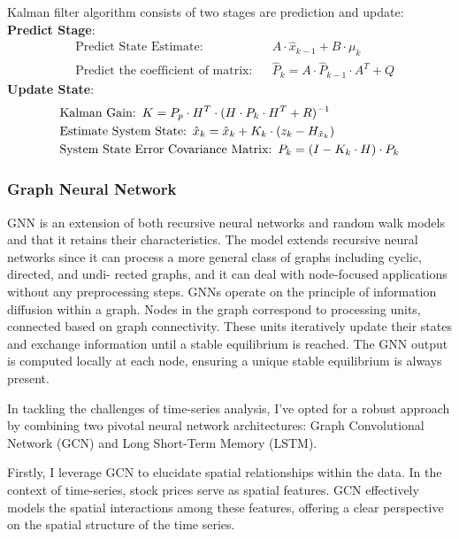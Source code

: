 \documentclass{ieeeojies}
\begin{document}
 Kalman filter algorithm consists of two stages are prediction and update: \\
\textbf{Predict Stage}:
    \begin{align*}
    &\text{Predict State Estimate:} && A \cdot \hat{x}_{k-1} + B \cdot \mu_k \\
    &\text{Predict the coefficient of matrix:} && \hat{P}_k = A \cdot \hat{P}_{k-1} \cdot A^T + Q
\end{align*}
\textbf{Update State}:
    \begin{align*}
    &\text{Kalman Gain:} \hspace{0.5em} K = P_p \cdot H^T \cdot (H \cdot P_k \cdot H^T + R)^{-1} \\
    &\text{Estimate System State:} \hspace{0.5em} \hat{x}_k = \hat{x}_k + K_k \cdot (z_k - H_{\hat{x}_k}) \\
    &\text{System State Error Covariance Matrix:} \hspace{0.5em} P_k = (I - K_k \cdot  H)\cdot P_k
    \end{align*}
    
\subsubsection{\textbf{Graph Neural Network}}
GNN is an extension of both recursive neural networks and random walk models and that it retains their characteristics. The model extends recursive neural networks since it can process a more general class of graphs including cyclic, directed, and undi- rected graphs, and it can deal with node-focused applications without any preprocessing steps. GNNs operate on the principle of information diffusion within a graph. Nodes in the graph correspond to processing units, connected based on graph connectivity. These units iteratively update their states and exchange information until a stable equilibrium is reached. The GNN output is computed locally at each node, ensuring a unique stable equilibrium is always present.

In tackling the challenges of time-series analysis, I've opted for a robust approach by combining two pivotal neural network architectures: Graph Convolutional Network (GCN) and Long Short-Term Memory (LSTM).

Firstly, I leverage GCN to elucidate spatial relationships within the data. In the context of time-series, stock prices serve as spatial features. GCN effectively models the spatial interactions among these features, offering a clear perspective on the spatial structure of the time series.
\end{document}
